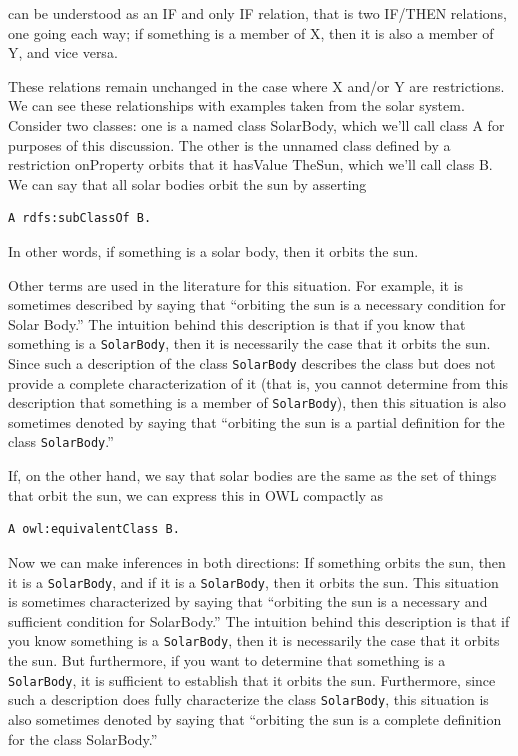 can be understood as an IF and only IF relation, that is two IF/THEN
relations, one going each way; if something is a member of X, then it is
also a member of Y, and vice versa.

These relations remain unchanged in the case where X and/or Y are
restrictions. We can see these relationships with examples taken from
the solar system. Consider two classes: one is a named class SolarBody,
which we'll call class A for purposes of this discussion. The other is
the unnamed class defined by a restriction onProperty orbits that it
hasValue TheSun, which we'll call class B. We can say that all solar
bodies orbit the sun by asserting

\begin{lstlisting}
A rdfs:subClassOf B.
\end{lstlisting}

In other words, if something is a solar body, then it orbits the sun.

Other terms are used in the literature for this situation. For example,
it is sometimes described by saying that ``orbiting the sun is a
necessary condition for Solar Body.'' The intuition behind this
description is that if you know that something is a \texttt{SolarBody}, then it
is necessarily the case that it orbits the sun. Since such a description
of the class \texttt{SolarBody} describes the class but does not provide a
complete characterization of it (that is, you cannot determine from this
description that something is a member of \texttt{SolarBody}), then this
situation is also sometimes denoted by saying that ``orbiting the sun is
a partial definition for the class \texttt{SolarBody}.''

If, on the other hand, we say that solar bodies are the same as the set
of things that orbit the sun, we
can express this in OWL compactly as

\begin{lstlisting}
A owl:equivalentClass B.
\end{lstlisting}

Now we can make inferences in both directions: If something orbits the
sun, then it is a \texttt{SolarBody}, and if it is a \texttt{SolarBody}, then it orbits
the sun. This situation is sometimes characterized by saying that
``orbiting the sun is a necessary and sufficient condition for
SolarBody.'' The intuition behind this description is that if you know
something is a \texttt{SolarBody}, then it is necessarily the case that it orbits
the sun. But furthermore, if you want to determine that something is a
\texttt{SolarBody}, it is sufficient to establish that it orbits the sun.
Furthermore, since such a description does fully characterize the class
\texttt{SolarBody}, this situation is also sometimes denoted by saying that
``orbiting the sun is a complete definition for the class SolarBody.''

